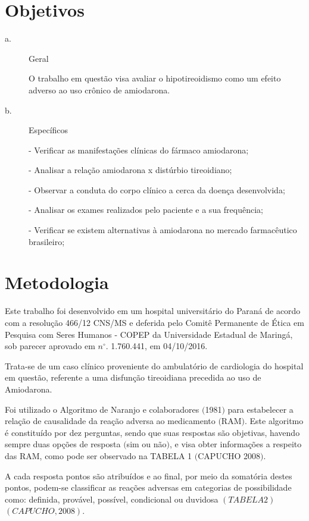\documentclass[svgnames,12pt,oneside, openright,a4paper]{scrbook}
\begin{document}
\chapter{Objetivos}

\begin{description}
   \item[a.] Geral
   
O trabalho em questão visa avaliar o hipotireoidismo como um efeito adverso ao uso crônico de amiodarona.    
   
   \item[b.] Específicos
   
- Verificar as manifestações clínicas do fármaco amiodarona; 

- Analisar a relação amiodarona x distúrbio tireoidiano;

- Observar a conduta do corpo clínico a cerca da doença desenvolvida;

- Analisar os exames realizados pelo paciente e a sua frequência; 

- Verificar se existem alternativas à amiodarona no mercado farmacêutico brasileiro; 
 
 \end{description}

\chapter{Metodologia}

Este trabalho foi desenvolvido em um hospital universitário do Paraná de acordo com a resolução 466/12 CNS/MS e deferida pelo Comitê Permanente de Ética em Pesquisa com Seres Humanos - COPEP da Universidade Estadual de Maringá, sob parecer aprovado em $n^{\circ}$. 1.760.441, em 04/10/2016.

Trata-se de um caso clínico proveniente do ambulatório de cardiologia do hospital em questão, referente a uma disfunção tireoidiana precedida ao uso de Amiodarona.

Foi utilizado o Algoritmo de Naranjo e colaboradores $($1981$)$ para estabelecer a relação de causalidade da reação adversa ao medicamento $($RAM$)$. Este algoritmo é constituído por dez perguntas, sendo que suas respostas são objetivas, havendo sempre duas opções de resposta $($sim ou não$)$, e visa obter informações a respeito das RAM, como pode ser observado na TABELA 1 $($CAPUCHO 2008$)$. 

A cada resposta pontos são atribuídos e ao final, por meio da somatória destes pontos, podem-se classificar as reações adversas em categorias de possibilidade como: definida, provável, possível, condicional ou duvidosa $(TABELA 2)$ $(CAPUCHO, 2008)$. 
\end{document}
